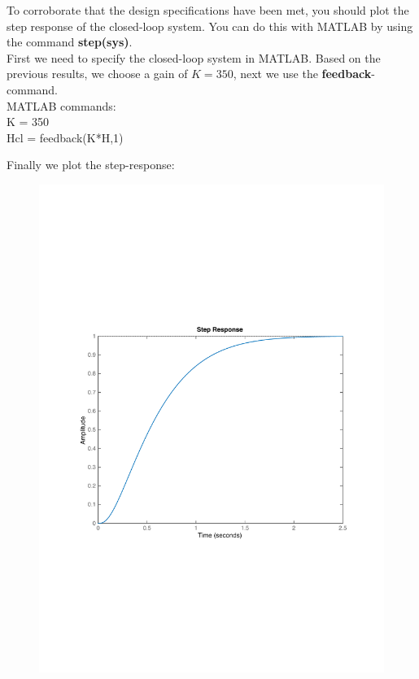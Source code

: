\begin{frame}
	\begin{exampleblock}{}
		\justify
		To corroborate that the design specifications have been met, you should plot the step response of the closed-loop system. You can do this with MATLAB by using the command \textbf{step(sys)}.\\
		\vspace{1em}
		First we need to specify the closed-loop system in MATLAB. Based on the previous results, we choose a gain of $K = 350$, next we use the \textbf{feedback}-command.\\
		\vspace{1em}
		MATLAB commands:\\
		K = 350\\
		Hcl = feedback(K*H,1)
	\end{exampleblock}
\end{frame}

\begin{frame}
	\begin{exampleblock}{}
	Finally we plot the step-response: 
	\begin{figure}
		\centering
		\includegraphics[width=0.7\linewidth]{matlab_ex7}
	\end{figure}
	\end{exampleblock}
\end{frame}
		

